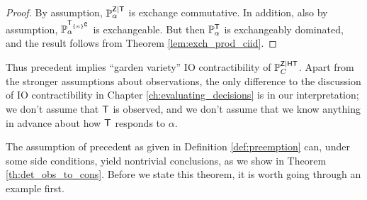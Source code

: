 \begin{proof}
By assumption, $\mathbb{P}_\alpha^{\mathsf{Z}|\mathsf{T}}$ is exchange commutative. In addition, also by assumption, $\mathbb{P}_\alpha^{\mathsf{T}_{\{n\}^\complement}}$ is exchangeable. But then $\mathbb{P}_\alpha^{\mathsf{T}}$ is exchangeably dominated, and the result follows from Theorem \ref{lem:exch_prod_ciid}.
\end{proof}

Thus precedent implies ``garden variety'' IO contractibility of $\mathbb{P}_C^{\mathsf{Z}|\mathsf{HT}}$. Apart from the stronger assumptions about observations, the only difference to the discussion of IO contractibility in Chapter \ref{ch:evaluating_decisions} is in our interpretation; we don't assume that $\mathsf{T}$ is observed, and we don't assume that we know anything in advance about how $\mathsf{T}$ responds to $\alpha$.

The assumption of precedent as given in Definition \ref{def:preemption} can, under some side conditions, yield nontrivial conclusions, as we show in Theorem \ref{th:det_obs_to_cons}. Before we state this theorem, it is worth going through an example first.

